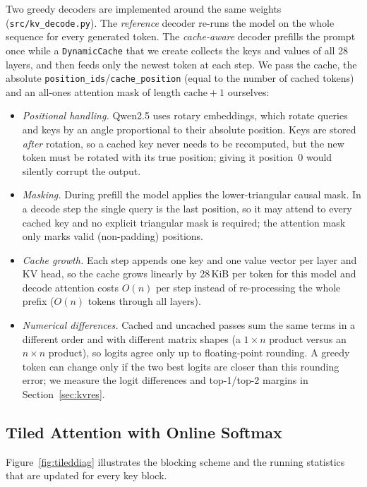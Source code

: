 Two greedy decoders are implemented around the same weights (\texttt{src/kv\_decode.py}). The \emph{reference} decoder re-runs the model on the whole sequence for every generated token. The \emph{cache-aware} decoder prefills the prompt once while a \texttt{DynamicCache} that we create collects the keys and values of all 28 layers, and then feeds only the newest token at each step. We pass the cache, the absolute \texttt{position\_ids}/\texttt{cache\_position} (equal to the number of cached tokens) and an all-ones attention mask of length $\text{cache}+1$ ourselves:
\begin{itemize}
\item \emph{Positional handling.} Qwen2.5 uses rotary embeddings, which rotate queries and keys by an angle proportional to their absolute position. Keys are stored \emph{after} rotation, so a cached key never needs to be recomputed, but the new token must be rotated with its true position; giving it position~0 would silently corrupt the output.
\item \emph{Masking.} During prefill the model applies the lower-triangular causal mask. In a decode step the single query is the last position, so it may attend to every cached key and no explicit triangular mask is required; the attention mask only marks valid (non-padding) positions.
\item \emph{Cache growth.} Each step appends one key and one value vector per layer and KV head, so the cache grows linearly by 28\,KiB per token for this model and decode attention costs $O(n)$ per step instead of re-processing the whole prefix ($O(n)$ tokens through all layers).
\item \emph{Numerical differences.} Cached and uncached passes sum the same terms in a different order and with different matrix shapes (a $1\times n$ product versus an $n\times n$ product), so logits agree only up to floating-point rounding. A greedy token can change only if the two best logits are closer than this rounding error; we measure the logit differences and top-1/top-2 margins in Section~\ref{sec:kvres}.
\end{itemize}

\subsection{Tiled Attention with Online Softmax}
\label{sec:attmethod}
Figure~\ref{fig:tileddiag} illustrates the blocking scheme and the running statistics that are updated for every key block.

